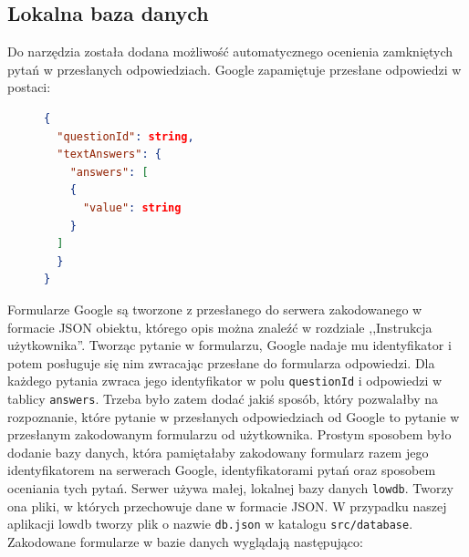 \subsection{Lokalna baza danych}
Do narzędzia została dodana możliwość automatycznego ocenienia zamkniętych pytań w 
przesłanych odpowiedziach. Google zapamiętuje przesłane odpowiedzi w postaci:
\begin{figure}[H]
  \begin{lstlisting}[language=json,firstnumber=1]
{
  "questionId": string,
  "textAnswers": {
    "answers": [
    {
      "value": string
    }
  ]
  }
}
  \end{lstlisting}
\end{figure}
Formularze Google są tworzone z przesłanego do serwera zakodowanego w formacie JSON obiektu,
którego opis można znaleźć w rozdziale ,,Instrukcja użytkownika''.
Tworząc pytanie w formularzu, Google nadaje mu identyfikator i potem posługuje się nim
zwracając przesłane do formularza odpowiedzi. Dla każdego pytania zwraca jego identyfikator 
w polu \texttt{questionId} i odpowiedzi w tablicy \texttt{answers}. Trzeba było zatem dodać
jakiś sposób, który pozwalałby na rozpoznanie, które pytanie w przesłanych odpowiedziach od 
Google to pytanie w przesłanym zakodowanym formularzu od użytkownika. Prostym sposobem było
dodanie bazy danych, która pamiętałaby zakodowany formularz razem jego identyfikatorem 
na serwerach Google, identyfikatorami pytań oraz sposobem oceniania tych pytań. Serwer
używa małej, lokalnej bazy
danych \texttt{lowdb}. Tworzy ona pliki, w których przechowuje dane w formacie JSON.
W przypadku naszej aplikacji lowdb tworzy plik o nazwie \texttt{db.json} w katalogu 
\texttt{src/database}. Zakodowane formularze w bazie danych wyglądają następująco:

